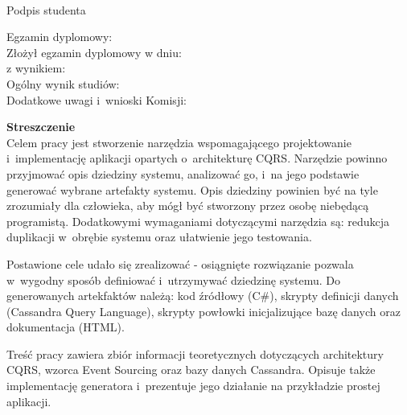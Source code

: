 \vspace{2cm}

\begin{flushright}
 \begin{minipage}{5cm}
  \dotfill \\[-0.7cm]
  \begin{center}
  \small Podpis studenta
  \end{center}
 \end{minipage}
\end{flushright}

\vspace{4cm}

\begin{flushleft}
 Egzamin dyplomowy: \\
 Złożył egzamin dyplomowy w dniu: \dotfill \\
 z wynikiem: \dotfill \\
 Ogólny wynik studiów: \dotfill \\
 Dodatkowe uwagi i~wnioski Komisji: \dotfill \\
 \hspace{0cm} \dotfill
\end{flushleft}

 
\newpage
\thispagestyle{empty}

\textbf{Streszczenie} \\

Celem pracy jest stworzenie narzędzia wspomagającego projektowanie i~implementację aplikacji opartych o~architekturę CQRS.
Narzędzie powinno przyjmować opis dziedziny systemu, analizować go, i~na jego podstawie generować wybrane artefakty systemu.
Opis dziedziny powinien być na tyle zrozumiały dla człowieka, aby mógł być stworzony przez osobę niebędącą programistą.
Dodatkowymi wymaganiami dotyczącymi narzędzia są: redukcja duplikacji w~obrębie systemu oraz ułatwienie jego testowania.

Postawione cele udało się zrealizować - osiągnięte rozwiązanie pozwala w~wygodny sposób definiować i~utrzymywać dziedzinę systemu.
Do generowanych artekfaktów należą: kod źródłowy (C\#), skrypty definicji danych (Cassandra Query Language), skrypty powłowki inicjalizujące bazę danych oraz dokumentacja (HTML).

Treść pracy zawiera zbiór informacji teoretycznych dotyczących architektury CQRS, wzorca Event Sourcing oraz bazy danych Cassandra.
Opisuje także implementację generatora i~prezentuje jego działanie na przykładzie prostej aplikacji.



